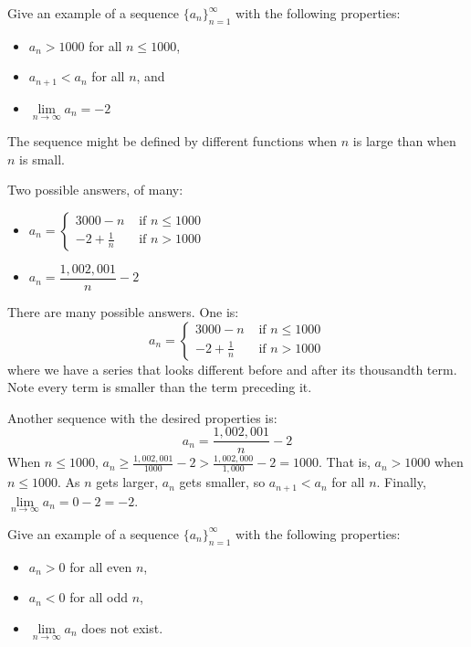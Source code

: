 \begin{question}
Give an example of a sequence $\{a_n\}_{n=1}^{\infty}$ with the following properties:
\begin{itemize}
\item $a_n>1000$ for all $n \leq 1000$,
\item $a_{n+1}<a_n$ for all $n$, and
\item $\lim\limits_{n \to \infty} a_n = -2$
\end{itemize}
\end{question}
\begin{hint}
The sequence might be defined by different functions when $n$ is large than when $n$ is small.
\end{hint}
\begin{answer}
Two possible answers, of many:
\begin{itemize}
\item $a_n = \begin{cases}
3000-n & \text{ if }n \leq 1000\\
-2+\frac{1}{n} & \text{ if }n > 1000
\end{cases}$
\item $a_n=\dfrac{1,002,001}{n}-2$
\end{itemize}
\end{answer}
\begin{solution}
There are many possible answers. One is:
\[a_n = \begin{cases}
3000-n & \text{ if }n \leq 1000\\
-2+\frac{1}{n} & \text{ if }n > 1000
\end{cases}\]
where we have a series that looks different before and after its thousandth term. Note every term is smaller than the term preceding it.

Another sequence with the desired properties is:
\[a_n=\frac{1,002,001}{n}-2\]
When $n \leq 1000$, $a_n \geq \frac{1,002,001}{1000}-2>\frac{1,002,000}{1,000}-2=1000$. That is, $a_n>1000$ when $n \le 1000$. As $n$ gets larger, $a_n$ gets smaller, so $a_{n+1}<a_n$ for all $n$. Finally, $\lim\limits_{n \to \infty} a_n = 0-2=-2$.
\end{solution}
\begin{Mquestion}\label{prob_s3.1:alternating}
Give an example of a sequence $\{a_n\}_{n=1}^{\infty}$ with the following properties:
\begin{itemize}
\item $a_n>0$ for all even $n$,
\item $a_n<0$ for all odd $n$,
\item $\lim\limits_{n \to \infty} a_n$ does not exist.
\end{itemize}
\end{Mquestion}
